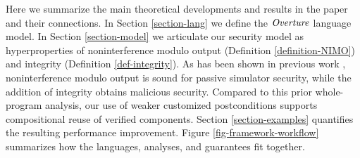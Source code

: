 Here we summarize the main theoretical developments and results in
the paper and their connections.  In Section \ref{section-lang}
we define the $\mathit{Overture}$ language model. In Section \ref{section-model}
we articulate our security model as hyperproperties of
noninterference modulo output (Definition \ref{definition-NIMO})
and integrity (Definition \ref{def-integrity}). As has been
shown in previous work \cite{skalka-near-ppdp24, skalka-near-esop25},
noninterference modulo output is sound for passive simulator
security, while the addition of integrity obtains malicious security.
Compared to this prior whole-program analysis, our use of weaker
customized postconditions supports compositional reuse of verified
components. Section \ref{section-examples} quantifies the resulting
performance improvement.
Figure \ref{fig-framework-workflow} summarizes how the languages,
analyses, and guarantees fit together.

